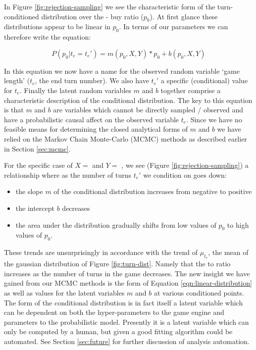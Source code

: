 In Figure \ref{fig:rejection-sampling} we see the characteristic
form of the turn-conditioned distribution over the
 -  buy ratio ($p_0$). At first glance
these distributions appear to be linear in $p_0$. In terms of our
parameters we can therefore write the equation:

\begin{equation} \label{eqn:linear-distribution}
P(p_0 | t_e = t_e') = m(p_0, X, Y) * p_0 + b(p_0, X, Y)
\end{equation}

In this equation we now have a name for the observed random variable
`game length' ($t_e$, the end turn number).
We also have $t_e'$ a specific (conditional) value for $t_e$.
Finally the latent random variables $m$ and $b$ together comprise a
characteristic description of the conditional distribution. The
key to this equation is that $m$ and $b$ are variables which cannot
be directly sampled / observed and have a probabilistic causal affect
on the observed variable $t_e$.
Since we have no feasible means for determining the closed analytical
forms of $m$ and $b$ we have relied on the Markov Chain Monte-Carlo (MCMC)
methods as described earlier in Section \ref{sec:mcmc}.

For the specific case of $X =$  and $Y =$ ,
we see (Figure \ref{fig:rejection-sampling}) a relationship where as the
number of turns $t_e'$ we condition on goes down:

\begin{itemize}
\item the slope $m$ of the conditional distribution increases from negative to positive
\item the intercept $b$ decreases
\item the area under the distribution gradually shifts from low values of $p_0$ to
      high values of $p_0$.
\end{itemize}

These trends are unsurprisingly in accordance with the trend of $\mu_{t_e}$,
the mean of the gaussian distribution of Figure \ref{fig:turn-dist}. Namely
that the  to  ratio increases as the number of
turns in the game decreases. The new insight we have gained from our MCMC
methods is the form of Equation \ref{eqn:linear-distribution} as well as values
for the latent variables $m$ and $b$ at various conditioned points. The form
of the conditional distribution is in fact itself a latent variable which
can be dependent on both the hyper-parameters to the game engine and parameters
to the probabilistic model. Presently it is a latent variable which can only be
computed by a human, but given a good fitting algorithm could be automated.
See Section \ref{sec:future} for further discussion of analysis automation.

